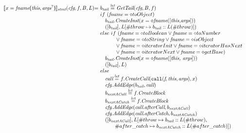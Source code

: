 \[\begin{array}{l@{}l@{~}l}
\transfun{\ircfgcall{x}{\emph{fname}}{\emph{this}, \emph{args}^{?}}}_{\emph{stmt}}(\emph{cfg}, f, B, L) & = &
b_{\emph{tail}} \letval \GetTail(\emph{cfg}, B, f)\\
& & if\ (\emph{fname} = \diamond{toObject}) \\
& & \phantom{if} b_{\emph{tail}}.\emph{CreateInst}(x =\diamond \emph{fname}([\emph{this,args}]))\\
& & \phantom{if} ([b_{\emph{tail}}], L[\#throw \mapsto b_{\emph{tail}} :: L(\#throw)])\\
& & else\ if\ (\emph{fname} = \diamond{toBoolean} \vee \emph{fname} = \diamond{toNumber}\\
& & \phantom{ififif} \vee \emph{fname} = \diamond{toString} \vee \emph{fname} = \diamond{isObject}\\
& & \phantom{ififif} \vee \emph{fname} = \diamond{iteratorInit} \vee \emph{fname} = \diamond{iteratorHasNext}\\
& & \phantom{ififif} \vee \emph{fname} = \diamond{iteratorNext}\vee \emph{fname} = \diamond{getBase})\\
& & \phantom{if} b_{\emph{tail}}.\emph{CreateInst}(x =\diamond \emph{fname}([\emph{this, args}]))\\
& & \phantom{if} ([b_{\emph{tail}}], L)\\
& & else\\
& & \phantom{if} \emph{call} \letval f.\emph{CreateCall}(\TT{call}(\emph{f},\emph{this},\emph{args}), x)\\
& & \phantom{if} \emph{cfg}.\emph{AddEdge}(b_{\emph{tail}}, \emph{call})\\
& & \phantom{if} b_{\emph{nextACall}} \letval f.\emph{CreateBlock}\\
& & \phantom{if} b_{\emph{nextACatch}} \letval f.\emph{CreateBlock}\\
& & \phantom{if} \emph{cfg}.\emph{AddEdge}(\emph{call}.\emph{afterCall}, b_{\emph{nextACall}}) \\
& & \phantom{if} \emph{cfg}.\emph{AddEdge}(\emph{call}.\emph{afterCatch}, b_{\emph{nextACatch}}) \\
& & \phantom{if} ([b_{\emph{nextACall}}], L[\# throw \mapsto b_{\emph{tail}} :: L(\# throw),\\
& & \phantom{ififif} \# after\_catch \mapsto b_{\emph{nextACatch}} :: L(\# after\_catch)])\\
\end{array}
\]

